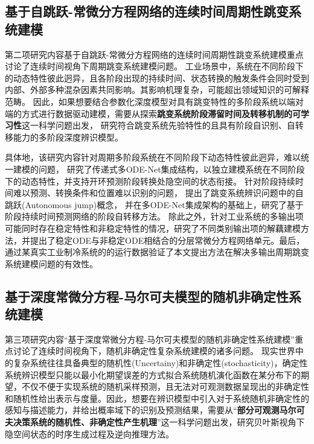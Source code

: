 

\subsection{基于自跳跃-常微分方程网络的连续时间周期性跳变系统建模}


第二项研究内容基于自跳跃-常微分方程网络的连续时间周期性跳变系统建模重点讨论了连续时间视角下周期跳变系统建模问题。
工业场景中，系统在不同阶段下的动态特性彼此迥异，且各阶段出现的持续时间、状态转换的触发条件会同时受到内部、外部多种混杂因素共同影响。其影响机理复杂，可能超出领域知识的可解释范畴。
因此，如果想要结合参数化深度模型对具有跳变特性的多阶段系统以端对端的方式进行数据驱动建模，需要从探索\textbf{跳变系统阶段滞留时间及转移机制的可学习性}这一科学问题出发，
研究符合跳变系统先验特性的且具有阶段自识别、自转移能力的多阶段深度辨识模型。


具体地，该研究内容针对周期多阶段系统在不同阶段下动态特性彼此迥异，难以统一建模的问题，
研究了传递式多ODE-Net集成结构，以独立建模系统在不同阶段下的动态特性，并支持开环预测阶段转换处隐空间的状态衔接。
针对阶段持续时间难以预测、转换条件和位置难以识别的问题，
提出了跳变系统辨识问题中的自跳跃(Autonomous jump)概念，
并在多ODE-Net集成架构的基础上，研究了基于阶段持续时间预测网络的阶段自转移方法。
除此之外，针对工业系统的多输出项可能同时存在稳定特性和非稳定特性的情况，研究了不同类别输出项的解藕建模方法，并提出了稳定ODE与非稳定ODE相结合的分层常微分方程网络单元。最后，通过某真实工业制冷系统的的运行数据验证了本文提出方法在解决多输出周期跳变系统建模问题的有效性。


\subsection{基于深度常微分方程-马尔可夫模型的随机非确定性系统建模}

第三项研究内容“基于深度常微分方程-马尔可夫模型的随机非确定性系统建模”重点讨论了连续时间视角下，随机非确定性复杂系统建模的诸多问题。
现实世界中的复杂系统往往具备典型的随机性(Uncertainy)和非确定性(stochasticity)，确定性系统辨识模型只能以最小化期望误差的方式拟合系统随机演化函数在某分布下的期望，不仅不便于实现系统的随机采样预测，且无法对可观测数据呈现出的非确定性和随机性给出表示与度量。因此，想要在辨识模型中引入对于系统随机非确定性的感知与描述能力，并给出概率域下的识别及预测结果，需要从“\textbf{部分可观测马尔可夫决策系统的随机性、非确定性产生机理}”这一科学问题出发，研究贝叶斯视角下隐空间状态的时序生成过程及逆向推理方法。

